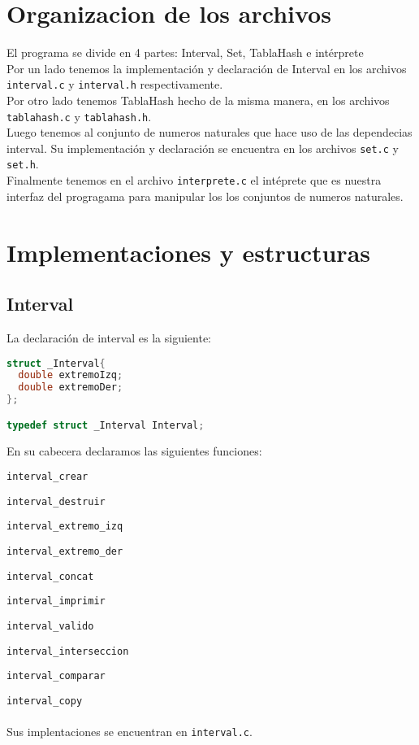 \documentclass[]{article}
\begin{document}
\section{Organizacion de los archivos}
El programa se divide en 4 partes: Interval, Set, TablaHash e intérprete\\
Por un lado tenemos la implementación y declaración de Interval en los archivos \verb|interval.c| y \verb|interval.h| respectivamente.\\
Por otro lado tenemos TablaHash hecho de la misma manera, en los archivos \verb|tablahash.c| y \verb|tablahash.h|.\\
Luego tenemos al conjunto de numeros naturales que hace uso de las dependecias interval. Su implementación y declaración se encuentra en los archivos \verb|set.c| y \verb|set.h|.\\
Finalmente tenemos en el archivo \verb|interprete.c| el intéprete que es nuestra interfaz del progragama para manipular los los conjuntos de numeros naturales.
\newpage
\section{Implementaciones y estructuras}
\subsection{Interval}
La declaración de interval es la siguiente:

\begin{lstlisting}[language=C]
struct _Interval{
  double extremoIzq;
  double extremoDer;
};

typedef struct _Interval Interval;
\end{lstlisting}
En su cabecera declaramos las siguientes funciones:

\verb|interval_crear|

\verb|interval_destruir|

\verb|interval_extremo_izq|

\verb|interval_extremo_der|

\verb|interval_concat|

\verb|interval_imprimir|

\verb|interval_valido|

\verb|interval_interseccion|

\verb|interval_comparar|

\verb|interval_copy|\\\\
Sus implentaciones se encuentran en \verb|interval.c|.
\end{document}
